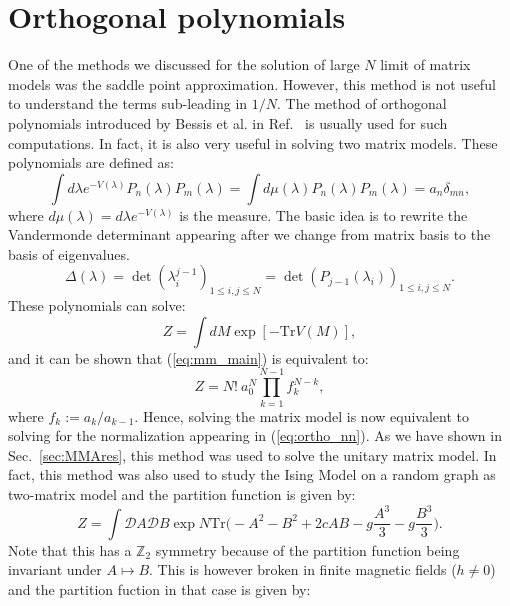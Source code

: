 \documentclass[letter,11pt]{article}
\begin{document}
\section{\label{sec:Ortho_pol1}Orthogonal polynomials}
One of the methods we discussed for the solution of 
large $N$ limit of matrix models was the saddle point approximation. 
However, this method is not useful 
to understand the terms sub-leading in $1/N$. The method 
of orthogonal polynomials introduced by Bessis et al. in Ref.~\cite{Bessis:1980ss} 
is usually used for such computations. In fact, it is also very useful in 
solving two matrix 
models. These polynomials are defined as:
\begin{equation}
	\label{eq:ortho_nn} 
	\int d\lambda e^{-V(\lambda)} P_{n}(\lambda)
	P_{m}(\lambda) = \int d \mu(\lambda) P_{n}(\lambda)
	P_{m}(\lambda) = a_{n} \delta_{mn} ,
\end{equation}
where $d \mu(\lambda) = d\lambda e^{-V(\lambda)}$ is the measure. 
The basic idea is to rewrite the Vandermonde determinant appearing after we change from matrix basis to the basis of eigenvalues. 
\begin{equation}
	\Delta(\lambda) = \det(\lambda_{i}^{j-1})_{1 \le i, j \le N} = \det(P_{j-1}(\lambda_i))_{1 \le i, j \le N}. 
\end{equation}
These polynomials can solve:
\begin{equation}
	\label{eq:mm_main}
	Z = \int dM \exp[-\mbox{Tr} V(M)] ,
\end{equation}
and it can be shown that (\ref{eq:mm_main}) is equivalent to:
\begin{equation}
\label{eq:ZOP} 
	Z = N! ~ a_{0}^{N} \prod_{k=1}^{N-1} f_{k}^{N-k},
\end{equation}
where $f_{k} := a_{k}/a_{k-1}$. Hence, solving the matrix model is now equivalent to solving for the 
normalization appearing in (\ref{eq:ortho_nn}). As we have shown in Sec.~\ref{sec:MMAres}, 
this method was used to solve the unitary 
matrix model. In fact, this method was also used to study the Ising Model on a random graph as two-matrix model 
\cite{Kazakov:1986hu}
and the partition function is given by:
\begin{equation}
	\label{eq:Kaz1} 
	Z = \int \mathcal{D}A \mathcal{D}B \exp N \mbox{Tr} \Bigg(-A^2 -B^2 + 2c AB -g \frac{A^3}{3} - g\frac{B^3}{3}  \Bigg). 
\end{equation}
Note that this has a $\mathbb{Z}_{2}$ symmetry because of 
the partition function being invariant under $A \mapsto B$. This is however broken in finite magnetic fields ($h \neq 0$) and the partition fuction in that case is given by:
\end{document}
